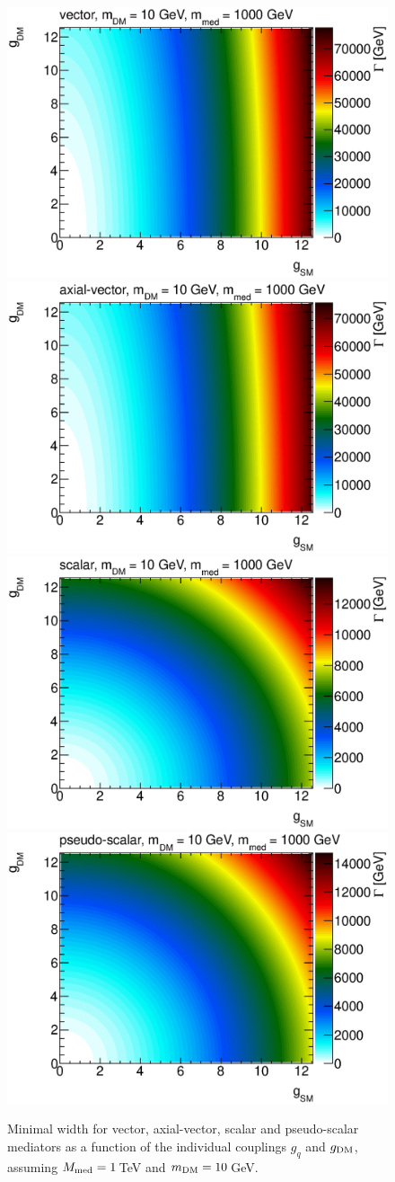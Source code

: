\begin{figure}
\centering
\includegraphics[width=0.45\linewidth]{figures/monojet/constantwidth_V_gg1000.eps}
\includegraphics[width=0.45\linewidth]{figures/monojet/constantwidth_A_gg1000.eps}\\
\includegraphics[width=0.45\linewidth]{figures/monojet/constantwidth_S_gg1000.eps}
\includegraphics[width=0.45\linewidth]{figures/monojet/constantwidth_P_gg1000.eps}
\caption{Minimal width for vector, axial-vector, scalar and pseudo-scalar mediators as a function of the individual couplings $g_q$ and $g_{\rm{DM}}$, assuming $M_{\rm{med}}=1$\,TeV and $m_{\rm{DM}}=10$\,GeV.}
\label{fig:monojet_width1000}
\end{figure}


